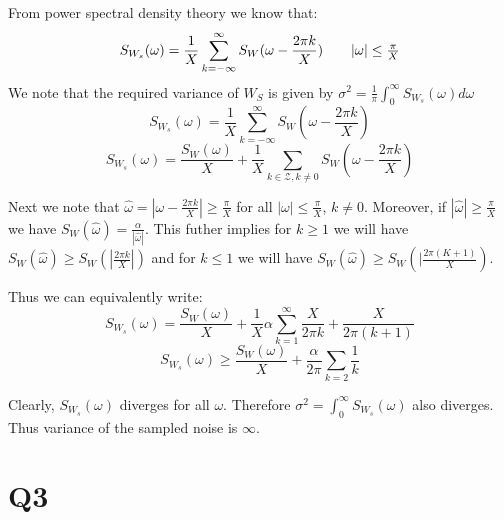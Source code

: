 \documentclass{article}
\begin{document}
From power spectral density theory we know that:
\begin{align}
  \label{eq:psd1}
  S_{W_s}(\omega) = \frac{1}{X}\sum_{k=-\infty}^{\infty}S_W(\omega - \frac{2\pi k}{X}) \tag*{$|\omega| \le \frac{\pi}{X}$}
\end{align}
We note that the required variance of $W_S$ is given by $\sigma^2 = \frac{1}{\pi} \int_{0}^{\infty}S_{W_s}(\omega)d\omega$
$$S_{W_s}(\omega) = \frac{1}{X} \sum_{k=-\infty}^{\infty}S_W(\omega - \frac{2\pi k}{X})$$
$$S_{W_s}(\omega) = \frac{S_W(\omega)}{X} + \frac{1}{X} \sum_{k \in \mathcal{Z}, k \ne 0} S_W(\omega - \frac{2 \pi k}{X})$$

Next we note that $\hat{\omega} = |\omega - \frac{2\pi k}{X}| \ge \frac{\pi}{X}$ for all $|\omega| \le \frac{\pi}{X}$, $k \ne 0$. Moreover, if $|\hat{\omega}| \ge \frac{\pi}{X}$ we have $S_W(\hat{\omega}) = \frac{\alpha}{|\hat{\omega}|}$. This futher implies for $k \ge 1$ we will have $S_W(\hat{\omega}) \ge S_W(|\frac{2\pi k}{X}|)$ and for $k \le 1$ we will have $S_W(\hat{\omega}) \ge S_W(|\frac{2 \pi (K+1)}{X})$.

Thus we can equivalently write:
$$S_{W_s}(\omega) = \frac{S_W(\omega)}{X} + \frac{1}{X} \alpha \sum_{k=1}^{\infty} \frac{X}{2\pi k} + \frac{X}{2\pi (k+1)}$$
$$S_{W_s}(\omega) \ge \frac{S_W(\omega)}{X} + \frac{\alpha}{2\pi} \sum_{k=2}\frac{1}{k}$$

Clearly, $S_{W_s}(\omega)$ diverges for all $\omega$. Therefore $\sigma^2 = \int_{0}^{\infty}S_{W_s}(\omega)$ also diverges. Thus variance of the sampled noise is $\infty$.



\section*{Q3}
\end{document}
